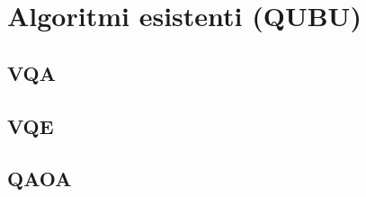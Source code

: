 \section{Algoritmi esistenti (QUBU)}\label{sec:algoritmi}

\subsection{VQA}\label{sec:vqa}
\subsection{VQE}\label{sec:vqe}
\subsection{QAOA}\label{sec:qaoa}